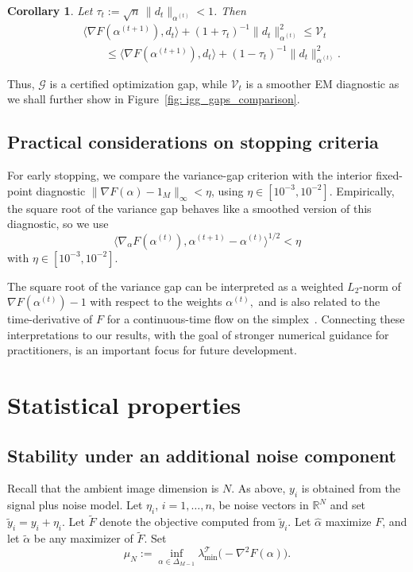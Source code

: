 \documentclass[12pt]{iopart}
\newtheorem{cor}{Corollary}
\theoremstyle{remark}
\begin{document}
\begin{cor}
\label{cor:cor}
Let $\tau_t:=\sqrt n\,\|d_t\|_{\alpha^{(t)}}<1$. Then
\begin{align*}
&\langle\nabla F(\alpha^{(t+1)}),d_t\rangle+(1+\tau_t)^{-1}\|d_t\|_{\alpha^{(t)}}^2
\leq\mathcal V_t\\
&\qquad\leq
\langle\nabla F(\alpha^{(t+1)}),d_t\rangle
+(1-\tau_t)^{-1} \|d_t\|_{\alpha^{(t)}}^2.
\end{align*}
\end{cor}



Thus, $\mathcal G$ is a certified optimization gap, while $\mathcal V_t$ is a
smoother EM diagnostic as we shall further show in Figure~\ref{fig: igg_gaps_comparison}.




\subsection{Practical considerations on stopping criteria}
For early stopping, we compare the variance-gap criterion with the
interior fixed-point diagnostic
$\|\nabla F(\alpha)-1_M\|_\infty<\eta$, using
$\eta\in[10^{-3},10^{-2}]$. Empirically, the square root of the variance gap
behaves like a smoothed version of this diagnostic, so we use
\[ 
\big\langle \nabla_\alpha F(\alpha^{(t)}), \alpha^{(t+1)}- \alpha^{(t)}\big\rangle^{1/2} < \eta
\]
with $\eta\in[10^{-3},10^{-2}]$.

The square root of the variance gap can be interpreted as a weighted $L_2$-norm of $\nabla F(\alpha^{(t)}) - 1$ with respect to the weights $\alpha^{(t)},$ and is also related to the time-derivative of $F$ for a continuous-time flow on the simplex~\citep{chok2025optimization}. Connecting these interpretations to our results, with the goal of stronger numerical guidance for practitioners, is an important focus for future development.

\section{Statistical properties}
\label{sec: stats}

\subsection{Stability under an additional noise
component}

Recall that the ambient image dimension is $N$. As above, $y_i$ is obtained from the signal plus noise model. 
Let $\eta_i$, $i=1,\ldots,n$, be noise vectors in $\mathbb{R}^N$ and set $\widetilde y_i=y_i+\eta_i$.  Let $\widetilde F$ denote the objective
computed from $\widetilde y_i$. Let $\widehat\alpha$ maximize $F$, and let
$\widetilde\alpha$ be any maximizer of $\widetilde F$. Set
\[
\mu_N:=
\inf_{\alpha\in\Delta_{M-1}}
\lambda_{\min}^{\mathcal T}\!\bigl(-\nabla^2F(\alpha)\bigr).
\]
\end{document}
